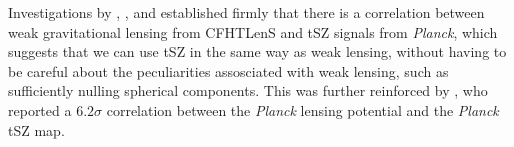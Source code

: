 Investigations by \cite{2014PhRvD..89b3508V}, \cite{2015JCAP...09..046M}, and \cite{2015JCAP...10..047H} established firmly that there is a correlation between weak gravitational lensing from CFHTLenS and tSZ signals from \emph{Planck}, which suggests that we can use tSZ in the same way as weak lensing, without having to be careful about the peculiarities assosciated with weak lensing, such as sufficiently nulling spherical components. This was further reinforced by \cite{2014JCAP...02..030H}, who reported a $6.2 \sigma$ correlation between the \emph{Planck}  lensing potential and the \emph{Planck}  tSZ map. 

